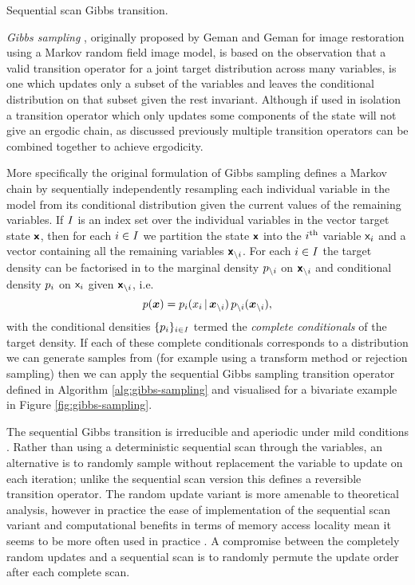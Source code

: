 \begin{algorithm}[!t]
\caption{Sequential scan Gibbs transition.}
\label{alg:gibbs-sampling}

\end{algorithm}

\emph{Gibbs sampling} \citep{geman1984stochastic,gelfand1990sampling}, originally proposed by Geman and Geman for image restoration using a Markov random field image model, is based on the observation that a valid transition operator for a joint target distribution across many variables, is one which updates only a subset of the variables and leaves the conditional distribution on that subset given the rest invariant. Although if used in isolation a transition operator which only updates some components of the state will not give an ergodic chain, as discussed previously multiple transition operators can be combined together to achieve ergodicity. 

More specifically the original formulation of Gibbs sampling defines a Markov chain by sequentially independently resampling each individual variable in the model from its conditional distribution given the current values of the remaining variables. If $\mathit{I}$ is an index set over the individual variables in the vector target state $\boldsymbol{\mathsf{x}}$, then for each $i \in \mathit{I}$ we partition the state $\boldsymbol{\mathsf{x}}$ into the $i^{\rm th}$ variable $\mathsf{x}_i$ and a vector containing all the remaining variables $\boldsymbol{\mathsf{x}}_{\backslash i}$. For each $i \in \mathit{I}$ the target density can be factorised in to the marginal density $p_{\backslash i}$ on $\boldsymbol{\mathsf{x}}_{\backslash i}$ and conditional density $p_i$ on $\mathsf{x}_i$ given $\boldsymbol{\mathsf{x}}_{\backslash i}$, i.e.
\begin{equation}\label{eq:gibbs-sampling-complete-conditional-factorisation}
  p(\boldsymbol{x}) = p_{i}(x_i \operatorname{|} \boldsymbol{x}_{\backslash i}) \, p_{\backslash i}(\boldsymbol{x}_{\backslash i}),
\end{equation}
with the conditional densities $\lbrace p_i \rbrace_{i \in \mathit{I}}$ termed the \emph{complete conditionals} of the target density. If each of these complete conditionals corresponds to a distribution we can generate samples from (for example using a transform method or rejection sampling) then we can apply the sequential Gibbs sampling transition operator defined in Algorithm \ref{alg:gibbs-sampling} and visualised for a bivariate example in Figure \ref{fig:gibbs-sampling}.

The sequential Gibbs transition is irreducible and aperiodic under mild conditions \citep{roberts1994simple,chan1993asymptotic}. Rather than using a deterministic sequential scan through the variables, an alternative is to randomly sample without replacement the variable to update on each iteration; unlike the sequential scan version this defines a reversible transition operator. The random update variant is more amenable to theoretical analysis, however in practice the ease of implementation of the sequential scan variant and computational benefits in terms of memory access locality mean it seems to be more often used in practice \citep{he2016scan}. A compromise between the completely random updates and a sequential scan is to randomly permute the update order after each complete scan.

